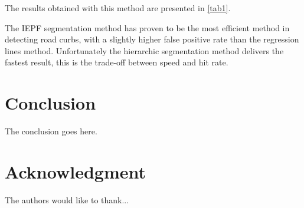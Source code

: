 \documentclass[conference]{IEEEtran}
\begin{document}
The results obtained with this method are presented in \ref{tab1}.

\begin{table}[]
\centering
\caption{My caption}
\label{tab1}
\end{table}

The IEPF segmentation method has proven to be the most efficient method in detecting road curbs, with a slightly higher false positive rate than the regression lines method. Unfortunately the hierarchic segmentation method delivers the fastest result, this is the trade-off between speed and hit rate.


\section{Conclusion}
The conclusion goes here.
\nocite{*}

\section*{Acknowledgment}

The authors would like to thank...





\end{document}
